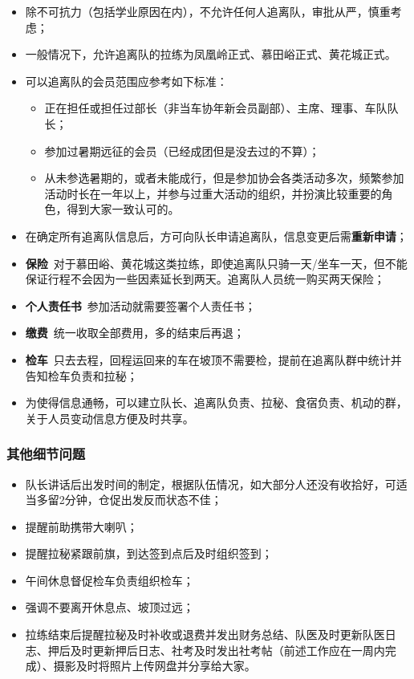 \documentclass[UTF8]{ctexart}
\begin{document}
\begin{itemize}[nosep,left=2em]
    \item 除不可抗力（包括学业原因在内），不允许任何人追离队，审批从严，慎重考虑；
    \item 一般情况下，允许追离队的拉练为凤凰岭正式、慕田峪正式、黄花城正式。
    \item 可以追离队的会员范围应参考如下标准：
    \begin{itemize}[nosep]
        \item 正在担任或担任过部长（非当车协年新会员副部）、主席、理事、车队队长；
        \item 参加过暑期远征的会员（已经成团但是没去过的不算）；
        \item 从未参选暑期的，或者未能成行，但是参加协会各类活动多次，频繁参加活动时长在一年以上，并参与过重大活动的组织，并扮演比较重要的角色，得到大家一致认可的。
    \end{itemize}
    \item 在确定所有追离队信息后，方可向队长申请追离队，信息变更后需\textbf{重新申请}；
    \item \textbf{保险}\ 对于慕田峪、黄花城这类拉练，即使追离队只骑一天/坐车一天，但不能保证行程不会因为一些因素延长到两天。追离队人员统一购买两天保险；
    \item \textbf{个人责任书}\ 参加活动就需要签署个人责任书；
    \item \textbf{缴费}\ 统一收取全部费用，多的结束后再退；
    \item \textbf{检车}\ 只去去程，回程运回来的车在坡顶不需要检，提前在追离队群中统计并告知检车负责和拉秘；
    \item 为使得信息通畅，可以建立队长、追离队负责、拉秘、食宿负责、机动的群，关于人员变动信息方便及时共享。
\end{itemize}

\subsubsection{其他细节问题}

\begin{itemize}[nosep,left=2em]
    \item 队长讲话后出发时间的制定，根据队伍情况，如大部分人还没有收拾好，可适当多留2分钟，仓促出发反而状态不佳；
    \item 提醒前助携带大喇叭；
    \item 提醒拉秘紧跟前旗，到达签到点后及时组织签到；
    \item 午间休息督促检车负责组织检车；
    \item 强调不要离开休息点、坡顶过远；
    \item 拉练结束后提醒拉秘及时补收或退费并发出财务总结、队医及时更新队医日志、押后及时更新押后日志、社考及时发出社考帖（前述工作应在一周内完成）、摄影及时将照片上传网盘并分享给大家。
\end{itemize}
\end{document}
